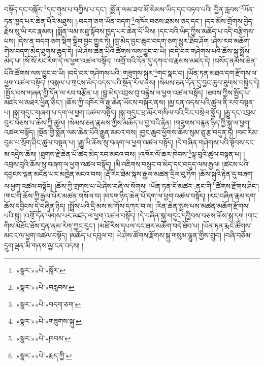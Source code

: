 བསྟོད་དང་བསྐོར་\footnote{«སྣར་»«པེ་»སྐོར་}དང་གུས་པ་བགྱིས་པ་དང་། །སྨོན་ལམ་ཟབ་མོ་སེམས་ཡིད་དང་བཏབ་པའི། བྱིན་རླབས་\footnote{«སྣར་»«པེ་»བརླབས་}ཡོན་ཏན་ཁྱད་པར་ཆེན་པོའི་མཐུས། །:བདག་ཅག་ཡོན་བདག་\footnote{«སྣར་»«པེ་»བདག་ཅག་}འཁོར་བཅས་ཐམས་ཅད་དང་། །དད་མོས་གྲོགས་བྱེད་རྗེས་སུ་ཡི་རང་རྣམས། །སྨོན་ལམ་མཐུ་སྟོབས་ཁྱད་པར་ཆེན་པོ་ཡིས། །དང་བའི་ཡིད་ཀྱིས་མཆོད་པ་འདི་བརྩིགས་པས། །དེས་ན་བདག་ཅག་སྡིག་སྒྲིབ་བྱང་གྱུར་ཏེ། །བླ་མེད་བྱང་ཆུབ་བདག་ཅག་མྱུར་ཐོབ་ཤོག །ཤེས་རབ་མཆོག་གིས་བདག་མེད་ཐུགས་ཆུད་དེ། །ཡེ་ཤེས་ཆེན་པོའི་ཚོགས་ལས་བྱུང་བ་ཡི། །བདེ་བར་གཤེགས་པའི་ཆོས་སྐུ་སྤྲོས་མེད་པ། །སོ་སོ་རང་རིག་དེ་ལ་ཕྱག་འཚལ་བསྟོད། །འགྲོ་བའི་དོན་དུ་དཀའ་བ་རྣམས་མཛད་དེ། །བསོད་ནམས་ཆེན་པོའི་ཚོགས་ལས་བྱུང་བ་ཡི། །བདེ་བར་གཤེགས་པའི་:གཟུགས་སྐུར་\footnote{«སྣར་»«པེ་»གཟུགས་སྐུ་}གང་སྣང་བ། །ཡོན་ཏན་མཐའ་དག་རྫོགས་ལ་ཕྱག་འཚལ་བསྟོད། །བསྐལ་པ་གྲངས་མེད་འདས་པའི་སྔོན་རོལ་ནས། །སེམས་ཅན་དོན་དུ་བྱང་ཆུབ་ཐུགས་བསྐྱེད་དེ། །སྤྱོད་པས་གཞན་གྱི་དོན་ལ་རབ་བརྩོན་པ། །བླ་མེད་འབྲས་བུ་བརྙེས་ལ་ཕྱག་འཚལ་བསྟོད། །ཐབས་ཀྱིས་སྤྱོད་པ་མཛད་པ་མཐར་ཕྱིན་ཅིང་། །ཆོས་ཀྱི་འཁོར་ལོ་རྒྱ་ཆེན་ཡོངས་བསྐོར་ནས། །མྱ་ངན་འདས་པའི་ཚུལ་ནི་རབ་བསྟན་པ། །སྐུ་གདུང་གཞག་པ་དག་ལ་ཕྱག་འཚལ་བསྟོད། །སྐུ་གདུང་ཕྲ་མོར་གསིལ་བའི་རིང་བསྲེལ་སྣོད། །རྒྱུ་དང་འབྲས་བུར་བཅས་པ་ཆོས་ཀྱི་ཚུལ། །སེམས་ཅན་རྣམས་ཀྱིས་མཆོད་པ་བྱ་བའི་རྟེན། །གཟུགས་བརྙན་ཉིད་ཀྱི་སྐུ་ལ་ཕྱག་འཚལ་བསྟོད། །སྔོན་གྱི་སྨོན་ལམ་ཆེན་པོའི་རྒྱུན་མངའ་བས། །བྱང་ཆུབ་ཕྱོགས་ཆོས་སུམ་ཅུ་རྩ་བདུན་ཏེ། །བང་རིམ་བུམ་པ་སྲོག་ཤིང་ཚུལ་བསྟན་པ། །རྒྱུ་ཡི་ཆོས་སུ་བཞག་ལ་ཕྱག་འཚལ་བསྟོད། །དེ་བཞིན་གཤེགས་པའི་སྟོབས་དང་མ་འདྲེས་ཆོས། །ཐུགས་རྗེ་ཆེན་པོ་ཚད་མེད་རབ་མངའ་བས། །འཁོར་ལོ་ཆར་ཁེབས་\footnote{«སྣར་»«པེ་»ཁབས་}ལྟ་བུའི་ཚུལ་བསྟན་པ། །འབྲས་བུའི་ཆོས་སུ་བཞག་ལ་ཕྱག་འཚལ་བསྟོད། །མི་འཇིགས་བསྲུང་བ་མེད་དང་བདུད་ལས་རྒྱལ། །ཚངས་པའི་དབྱངས་ལྡན་མངོན་པར་མཁྱེན་མངའ་བས། །རྡོ་རིང་ཐེམ་སྐས་རྒྱལ་མཚན་དྲིལ་བུ་ཏོག །ཆོས་སྐུའི་རྟེན་དུ་བཞག་ལ་ཕྱག་འཚལ་བསྟོད། །ཆོས་ཀྱི་གྲགས་པ་ཡེ་ཤེས་བཞི་ལ་སོགས། །ཡོན་ཏན་ངོ་མཚར་:ནང་གི་\footnote{«སྣར་»«པེ་»རྨད་ཀྱི་}ཚོགས་རྫོགས་ཤིང་། །གང་གི་ཆོས་ཀྱི་རྒྱལ་པོར་མཚན་གསོལ་བ། །བདག་ཉིད་ཆེན་པོ་དག་ལ་ཕྱག་འཚལ་བསྟོད། །རང་བཞིན་རྣམ་དག་ཆོས་དབྱིངས་དེ་བཞིན་ཉིད། །སྤྲོས་པའི་དྲི་མས་མ་གོས་དཀར་བ་ལ། །རིན་ཆེན་སྤྲས་པས་མཚན་མཆོག་རྫོགས་པའི་སྐུ། །འགྲོ་དོན་ལེགས་པར་མཛད་ལ་ཕྱག་འཚལ་བསྟོད། །དེ་བཞིན་སྐུ་གདུང་དབྱིབས་བཅས་ཆོས་སྐུ་དག །གང་གིས་མཐོང་ཐོས་དྲན་ནམ་རེག་ཀྱང་རུང་། །མཐོ་རིས་དཔལ་དང་ཐར་མཆོག་བདེ་ཐོབ་པ། །ཡོན་ཏན་རྨང་ཚོགས་མངའ་ལ་ཕྱག་འཚལ་བསྟོད། །མཆོད་པ་དབུལ་བ། ཡེ་ཤེས་ཚོགས་རྫོགས་སྐུ་གསུམ་ལྷུན་གྱིས་གྲུབ། །བཞི་བཅོམ་དྲུག་ལྡན་མི་གནས་མྱ་ངན་འདས། །
